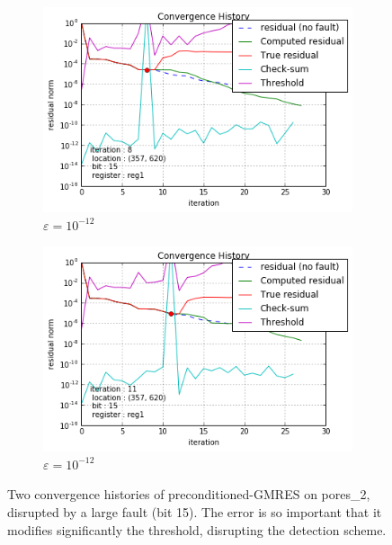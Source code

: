 \begin{figure}[h]
	\centering

    \begin{minipage}[b]{0.48\linewidth}
	
    \begin{subfigure}[t]{\linewidth}
		\centering
		\includegraphics[width=1.1\linewidth]{figures/pores_2/convergence_history_problem_1.png}
		\caption{$\varepsilon = 10^{-12}$}\label{fig:gre_216a_test_result_1}	
	\end{subfigure}
    \end{minipage}
    \quad
    \begin{minipage}[b]{0.48\linewidth}
    	
	
    \begin{subfigure}[t]{\linewidth}
		\centering
		\includegraphics[width=1.1\linewidth]{figures/pores_2/convergence_history_problem_0.png}
		\caption{$\varepsilon = 10^{-12}$}\label{fig:pores_2_test_result_1}	
	\end{subfigure}

	\end{minipage}
\caption{Two convergence histories of preconditioned-GMRES on pores_2, disrupted by a large fault (bit 15). The error is so important that it modifies significantly the threshold, disrupting the detection scheme.}\label{fig:test_result}
\end{figure}\label{fig:why}






